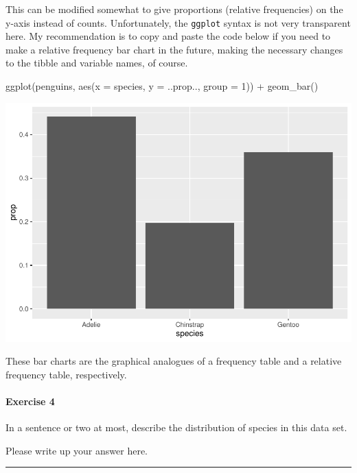 \documentclass[
]{book}
\newenvironment{Shaded}{\begin{snugshade}}{\end{snugshade}}
\newcommand{\AttributeTok}[1]{\textcolor[rgb]{0.77,0.63,0.00}{#1}}
\newcommand{\DecValTok}[1]{\textcolor[rgb]{0.00,0.00,0.81}{#1}}
\newcommand{\FunctionTok}[1]{\textcolor[rgb]{0.00,0.00,0.00}{#1}}
\newcommand{\NormalTok}[1]{#1}
\newcommand{\SpecialCharTok}[1]{\textcolor[rgb]{0.00,0.00,0.00}{#1}}
\begin{document}
This can be modified somewhat to give proportions (relative frequencies) on the y-axis instead of counts. Unfortunately, the \texttt{ggplot} syntax is not very transparent here. My recommendation is to copy and paste the code below if you need to make a relative frequency bar chart in the future, making the necessary changes to the tibble and variable names, of course.

\begin{Shaded}
\begin{Highlighting}[]
\FunctionTok{ggplot}\NormalTok{(penguins, }\FunctionTok{aes}\NormalTok{(}\AttributeTok{x =}\NormalTok{ species, }\AttributeTok{y =}\NormalTok{ ..prop.., }\AttributeTok{group =} \DecValTok{1}\NormalTok{)) }\SpecialCharTok{+}
    \FunctionTok{geom\_bar}\NormalTok{()}
\end{Highlighting}
\end{Shaded}

\includegraphics{intro_stats_files/figure-latex/unnamed-chunk-56-1.pdf}

These bar charts are the graphical analogues of a frequency table and a relative frequency table, respectively.

\hypertarget{exercise-4}{%
\paragraph*{Exercise 4}\label{exercise-4}}

In a sentence or two at most, describe the distribution of species in this data set.

Please write up your answer here.

\begin{center}\rule{0.5\linewidth}{0.5pt}\end{center}
\end{document}
